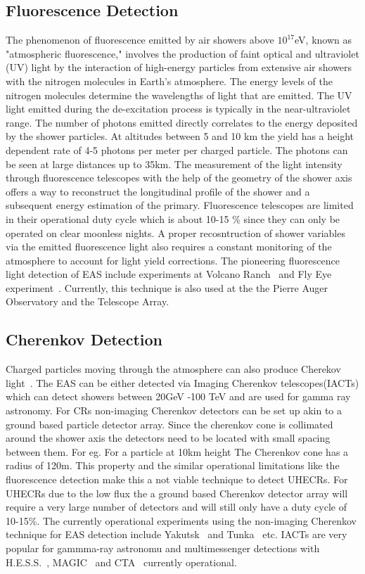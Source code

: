\subsection*{Fluorescence Detection}
\label{sec:EAS_flu}
The phenomenon of fluorescence emitted by air showers above $10^{17}$eV, known as "atmospheric fluorescence," involves the production of faint optical and ultraviolet (UV) light by the interaction of high-energy particles from extensive air showers with the nitrogen molecules in Earth's atmosphere. The energy levels of the nitrogen molecules determine the wavelengths of light that are emitted. The UV light emitted during the de-excitation process is typically in the near-ultraviolet range. The number of photons emitted directly correlates to the energy deposited by the shower particles. At altitudes between 5 and 10 km the yield has a height dependent rate of 4-5 photons per meter per charged particle. The photons can be seen at large distances up to 35km. The measurement of the light intensity through fluorescence telescopes with the help of the geometry of the shower axis offers a way to reconstruct the longitudinal profile of the shower and a subsequent energy estimation of the primary. Fluorescence telescopes are limited in their operational duty cycle which is about 10-15 \% since they can only be operated on clear moonless nights. A proper recosntruction of shower variables via the emitted fluorescence light also requires a constant monitoring of the atmosphere to account for light yield corrections. The pioneering fluorescence light detection of EAS include experiments at Volcano Ranch~\cite{} and Fly Eye experiment~\cite{}. Currently, this technique is also used at the the Pierre Auger Observatory and the Telescope Array.


\subsection*{Cherenkov Detection}
\label{sec:EAS_cher}
Charged particles moving through the atmosphere can also produce Cherekov light~\cite{}. The EAS can be either detected via Imaging Cherenkov telescopes(IACTs) which can detect showers between 20GeV -100 TeV and are used for gamma ray astronomy. For CRs non-imaging Cherenkov detectors can be set up akin to a ground based particle detector array. Since the cherenkov cone is collimated around the shower axis the detectors need to be located with small spacing between them. For eg. For a particle at 10km height The Cherenkov cone has a radius of 120m. This property and the similar operational limitations like the fluorescence detection make this a not viable technique to detect UHECRs. For UHECRs due to the low flux the a ground based Cherenkov detector array will require a very large number of detectors and will still only have a duty cycle of 10-15\%. The currently operational experiments using the non-imaging Cherenkov technique for EAS detection include Yakutsk~\cite{} and Tunka~\cite{} etc. IACTs are very popular for gammma-ray astronomu and multimessenger detections with H.E.S.S.~\cite{}, MAGIC~\cite{} and CTA~\cite{} currently operational. 

